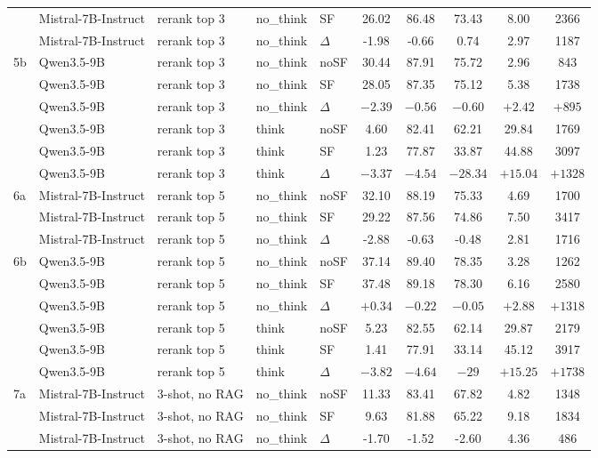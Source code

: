 \begin{scriptsize}
\begin{longtable}{l l l l l c c c c c}
 & Mistral-7B-Instruct & rerank top 3 & no\_think & SF & 26.02 & 86.48 & 73.43 & 8.00 & 2366 \\
 & Mistral-7B-Instruct & rerank top 3 & no\_think & $\Delta$ & -1.98 & -0.66 & 0.74 & 2.97 & 1187 \\
5b & Qwen3.5-9B & rerank top 3 & no\_think & noSF & 30.44 & 87.91 & 75.72 & 2.96 & 843 \\
 & Qwen3.5-9B & rerank top 3 & no\_think & SF & 28.05 & 87.35 & 75.12 & 5.38 & 1738 \\
 & Qwen3.5-9B & rerank top 3 & no\_think & $\Delta$ & $-2.39$ & $-0.56$ & $-0.60$ & $+2.42$ & $+895$ \\
 & Qwen3.5-9B & rerank top 3 & think & noSF & 4.60 & 82.41 & 62.21 & 29.84 & 1769 \\
 & Qwen3.5-9B & rerank top 3 & think & SF & 1.23 & 77.87 & 33.87 & 44.88 & 3097 \\
 & Qwen3.5-9B & rerank top 3 & think & $\Delta$ & $-3.37$ & $-4.54$ & $-28.34$ & $+15.04$ & $+1328$ \\
\dmidrule
6a & Mistral-7B-Instruct & rerank top 5 & no\_think & noSF & 32.10 & 88.19 & 75.33 & 4.69 & 1700 \\
 & Mistral-7B-Instruct & rerank top 5 & no\_think & SF & 29.22 & 87.56 & 74.86 & 7.50 & 3417 \\
 & Mistral-7B-Instruct & rerank top 5 & no\_think & $\Delta$ & -2.88 & -0.63 & -0.48 & 2.81 & 1716 \\
6b & Qwen3.5-9B & rerank top 5 & no\_think & noSF & 37.14 & 89.40 & 78.35 & 3.28 & 1262 \\
 & Qwen3.5-9B & rerank top 5 & no\_think & SF & 37.48 & 89.18 & 78.30 & 6.16 & 2580 \\
 & Qwen3.5-9B & rerank top 5 & no\_think & $\Delta$ & $+0.34$ & $-0.22$ & $-0.05$ & $+2.88$ & $+1318$ \\
 & Qwen3.5-9B & rerank top 5 & think & noSF & 5.23 & 82.55 & 62.14 & 29.87 & 2179 \\
 & Qwen3.5-9B & rerank top 5 & think & SF & 1.41 & 77.91 & 33.14 & 45.12 & 3917 \\
 & Qwen3.5-9B & rerank top 5 & think & $\Delta$ & $-3.82$ & $-4.64$ & $-29$ & $+15.25$ & $+1738$ \\
\dmidrule
7a & Mistral-7B-Instruct & 3-shot, no RAG & no\_think & noSF & 11.33 & 83.41 & 67.82 & 4.82 & 1348 \\
 & Mistral-7B-Instruct & 3-shot, no RAG & no\_think & SF & 9.63 & 81.88 & 65.22 & 9.18 & 1834 \\
 & Mistral-7B-Instruct & 3-shot, no RAG & no\_think & $\Delta$ & -1.70 & -1.52 & -2.60 & 4.36 & 486 \\

\end{longtable}
\end{scriptsize}

